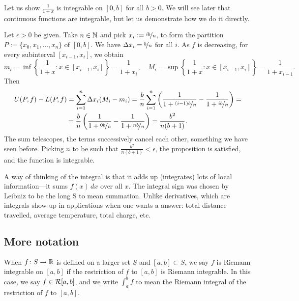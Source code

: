 \begin{example}
Let us show $\frac{1}{1+x}$ is integrable on $[0,b]$ for all $b > 0$.
We will see later that continuous functions are integrable, but let us
demonstrate how we do it directly.

Let $\epsilon > 0$ be given.  Take $n \in {\mathbb{N}}$ and
pick $x_i := \nicefrac{ib}{n}$, to form the 
partition $P := \{ x_0,x_1,\ldots,x_n \}$ of $[0,b]$.
We have $\Delta x_i = \nicefrac{b}{n}$ for all $i$.  
As $f$ is decreasing, for every subinterval $[x_{i-1},x_i]$, we obtain
\begin{equation*}
m_i = \inf \left\{ \frac{1}{1+x} : x \in [x_{i-1},x_i] \right\} = \frac{1}{1+x_i} ,
\quad
M_i = \sup \left\{ \frac{1}{1+x} : x \in [x_{i-1},x_i] \right\} =
\frac{1}{1+x_{i-1}} .
\end{equation*}
Then
\begin{multline*}
U(P,f)-L(P,f)
=
\sum_{i=1}^n
\Delta x_i
(M_i-m_i)
=
\frac{b}{n}
\sum_{i=1}^n 
\left( \frac{1}{1+\nicefrac{(i-1)b}{n}} - \frac{1}{1+\nicefrac{ib}{n}} \right) 
=
\\
=
\frac{b}{n}
\left( \frac{1}{1+\nicefrac{0b}{n}} - \frac{1}{1+\nicefrac{nb}{n}} \right) 
=
\frac{b^2}{n(b+1)} .
\end{multline*}
The sum telescopes, the terms successively cancel each other, something
we have seen before.
Picking $n$ to be such that
$\frac{b^2}{n(b+1)} < \epsilon$, the proposition is satisfied, and the
function is integrable.
\end{example}

\begin{remark}
A way of thinking of the integral is that it adds up (integrates) lots of
local information---it sums $f(x)\,dx$ over all $x$.
The integral sign was chosen by Leibniz to be the long S to mean summation.
Unlike derivatives, which are  
integrals show up in applications when
one wants a  answer: total distance travelled, average
temperature, total charge, etc.
\end{remark}

\subsection{More notation}

When $f \colon S \to {\mathbb{R}}$ is defined on a larger set $S$ and
$[a,b] \subset S$,
we say $f$ is Riemann integrable on $[a,b]$ if the restriction of $f$
to $[a,b]$ is Riemann integrable. 
In this case,
we say $f \in {\mathcal{R}}[a,b]$,
and
we write $\int_a^b f$ to mean the Riemann integral
of the restriction of $f$ to $[a,b]$.

